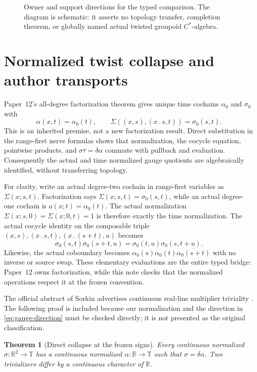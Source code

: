 \documentclass[11pt]{article}
\newtheorem{theorem}{Theorem}[section]
\theoremstyle{definition}
\newcommand{\R}{\mathbb R}
\newcommand{\T}{\mathbb T}
\begin{document}
\begin{figure}[t]
\centering
\resizebox{\linewidth}{!}{}
\caption{Owner and support directions for the typed comparison.  The diagram
is schematic: it asserts no topology transfer, completion theorem, or
globally named actual twisted groupoid $C^*$-algebra.}
\label{fig:owner-support}
\end{figure}
\FloatBarrier

\section{Normalized twist collapse and author transports}\label{sec:twists}

Paper~12's all-degree factorization theorem gives unique time cochains
$\alpha_0$ and $\sigma_0$ with
\[
 \alpha(x,t)=\alpha_0(t),\qquad
 \Sigma((x,s),(x\mathbin{.}s,t))=\sigma_0(s,t).
\]
This is an inherited premise, not a new factorization result.  Direct
substitution in the range-first nerve formulas shows that normalization,
the cocycle equation, pointwise products, and
$\sigma\overline\tau=\delta\alpha$ commute with pullback and evaluation.
Consequently the actual and time normalized gauge quotients are algebraically
identified, without transferring topology.

For clarity, write an actual degree-two cochain in range-first variables as
$\Sigma(x;s,t)$.  Factorization says $\Sigma(x;s,t)=\sigma_0(s,t)$, while an
actual degree-one cochain is $a(x;t)=\alpha_0(t)$.  The actual normalization
$\Sigma(x;s,0)=\Sigma(x;0,t)=1$ is therefore exactly the time normalization.
The actual cocycle identity on the composable triple
$(x,s),(x\mathbin{.}s,t),(x\mathbin{.}(s+t),u)$ becomes
\[
 \sigma_0(s,t)\sigma_0(s+t,u)
 =\sigma_0(t,u)\sigma_0(s,t+u).
\]
Likewise, the actual coboundary becomes
$\alpha_0(s)\alpha_0(t)\overline{\alpha_0(s+t)}$ with no inverse or source
swap.  These elementary evaluations are the entire typed bridge: Paper~12
owns factorization, while this note checks that the normalized operations
respect it at the frozen convention.

The official abstract of Sorkin advertises continuous real-line multiplier
triviality \citep{Sorkin1978Triviality}.  The following proof is included
because our normalization and the direction in \cref{eq:gauge-direction}
must be checked directly; it is not presented as the original
classification.

\begin{theorem}[Direct collapse at the frozen signs]\label{thm:collapse}
Every continuous normalized $\sigma:\R^2\to\T$ has a continuous normalized
$\alpha:\R\to\T$ such that $\sigma=\delta\alpha$.  Two trivializers differ
by a continuous character of $\R$.
\end{theorem}
\end{document}
